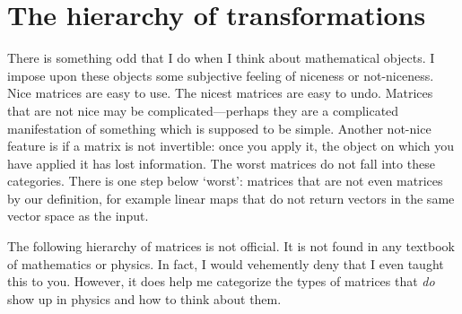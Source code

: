 \documentclass[12pt, oneside]{report}    %
\let\oldsection\section
\def\section{%
  \setcounter{sidenote}{1}%
  \oldsection
}
\begin{document}
\section{The hierarchy of transformations}

There is something odd that I do when I think about mathematical objects. I impose upon these objects some subjective feeling of niceness or not-niceness. Nice matrices are easy to use. The nicest matrices are easy to undo. Matrices that are not nice may be complicated---perhaps they are a complicated manifestation of something which is supposed to be simple. Another not-nice feature is if a matrix is not invertible: once you apply it, the object on which you have applied it has lost information. The worst matrices do not fall into these categories. There is one step below `worst': matrices that are not even matrices by our definition, for example linear maps that do not return vectors in the same vector space as the input.

The following hierarchy of matrices is not official. It is not found in any textbook of mathematics or physics. In fact, I would vehemently deny that I even taught this to you. However, it does help me categorize the types of matrices that \emph{do} show up in physics and how to think about them.
\end{document}
